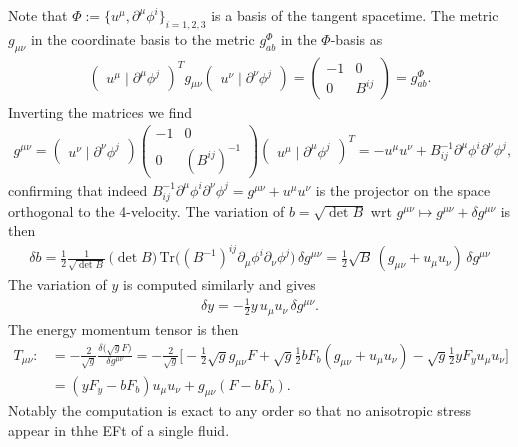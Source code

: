 Note that $\Phi:=\{u^\mu, \partial^\mu \phi^i\}_{i=1,2,3}$ is a basis of the tangent spacetime.
The metric $g_{\mu\nu}$ in the coordinate basis to the metric $g^\Phi_{ab}$ in the $\Phi$-basis as
\begin{align}
     \begin{pmatrix} u^\mu \mid  \partial^\mu \phi^j\end{pmatrix}^T g_{\mu\nu} \begin{pmatrix} u^\nu  \mid  \partial^\nu \phi^j\end{pmatrix}= \begin{pmatrix} -1 & 0\\ 0 & B^{ij}\end{pmatrix} = g^{\Phi}_{ab}.
\end{align}
Inverting the matrices we find 
\begin{align}
    g^{\mu\nu}=\begin{pmatrix} u^\nu  \mid  \partial^\nu \phi^j\end{pmatrix}\begin{pmatrix} -1 & 0\\ 0 & (B^{ij})^{-1}\end{pmatrix} \begin{pmatrix} u^\mu \mid  \partial^\mu \phi^j\end{pmatrix}^T = -u^\mu u^\nu + B^{-1}_{ij} \partial^\mu \phi^i \partial^\nu \phi^j,
\end{align}
confirming that indeed $B^{-1}_{ij} \partial^\mu \phi^i \partial^\nu \phi^j= g^{\mu\nu}+u^\mu u^\nu$ is the projector on the space orthogonal to the 4-velocity.
The variation of $b=\sqrt{\det B}$ wrt $g^{\mu\nu}\mapsto g^{\mu\nu}+\delta g^{\mu\nu}$ is then
\begin{align}
    \delta b= \tfrac12 \frac{1}{\sqrt{\det B}}\, \big(\det B\big)\, \text{Tr}\Big((B^{-1})^{ij} \partial_\mu \phi^i \partial_\nu \phi^j\Big) \, \delta g^{\mu\nu} = \tfrac12 \sqrt{B}\,  (g_{\mu\nu}+u_\mu u_\nu)\, \delta g^{\mu\nu}
\end{align}
The variation of $y$ is computed similarly and gives
\begin{align}
    \delta y = -\tfrac12 y \, u_\mu u_\nu \, \delta g^{\mu\nu}.
\end{align}
The energy momentum tensor is then
{\small
\begin{align}
    T_{\mu\nu}:&=-\frac{2}{\sqrt{g}}\frac{\delta \big(\sqrt{g}F\big)}{\delta g^{\mu\nu}} = -\frac{2}{\sqrt{g}}\Big[ -\tfrac12 \sqrt{g}g_{\mu\nu} F +\sqrt{g}\tfrac12 b F_b (g_{\mu\nu}+u_\mu u_\nu) - \sqrt{g}\tfrac12 y F_y u_\mu u_\nu\Big]\\[2.5pt]
    & = (yF_y - bF_b) u_\mu u_\nu + g_{\mu\nu} (F-bF_b).
\end{align}}
Notably the computation is exact to any order so that no anisotropic stress appear in thhe EFt of a single fluid.



